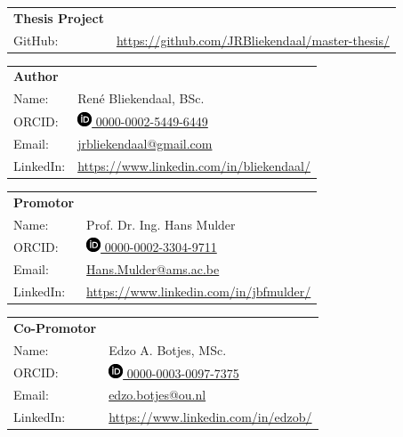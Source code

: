 \vspace{\baselineskip}

	\begin{tabular}{p{}p{}}
		\textbf{Thesis Project} & \\
		GitHub: & \url{https://github.com/JRBliekendaal/master-thesis/}\\
	\end{tabular}

\vspace{\baselineskip}

	\begin{tabular}{p{}p{}}
		\textbf{Author} & \\
		Name: & René Bliekendaal, BSc. \\
		ORCID: & \href{https://orcid.org/0000-0002-5449-6449/}{\includegraphics[scale=0.45]{images/ORCIDiD_icon} 0000-0002-5449-6449}\\
		Email: & \href{mailto:jrbliekendaal@gmail.com}{jrbliekendaal@gmail.com}\\
		LinkedIn: & \url{https://www.linkedin.com/in/bliekendaal/}\\
	\end{tabular}

\vspace{\baselineskip}

	\begin{tabular}{p{}p{}}
		\textbf{Promotor} & \\
		Name: & Prof. Dr. Ing. Hans Mulder \\
		ORCID: & \href{https://orcid.org/0000-0002-3304-9711/}{\includegraphics[scale=0.45]{images/ORCIDiD_icon} 0000-0002-3304-9711}\\
		Email: & \href{mailto:hans.mulder@ams.ac.be}{Hans.Mulder@ams.ac.be}\\
		LinkedIn: & \url{https://www.linkedin.com/in/jbfmulder/}\\
	\end{tabular}

\vspace{\baselineskip}

	\begin{tabular}{p{}p{}}
		\textbf{Co-Promotor} & \\
		Name: & Edzo A. Botjes, MSc. \\
		ORCID: & \href{https://orcid.org/0000-0003-0097-7375/}{\includegraphics[scale=0.45]{images/ORCIDiD_icon} 0000-0003-0097-7375}\\
		Email: & \href{mailto:edzo.botjes@ou.nl}{edzo.botjes@ou.nl}\\
		LinkedIn: & \url{https://www.linkedin.com/in/edzob/}\\
	\end{tabular}


